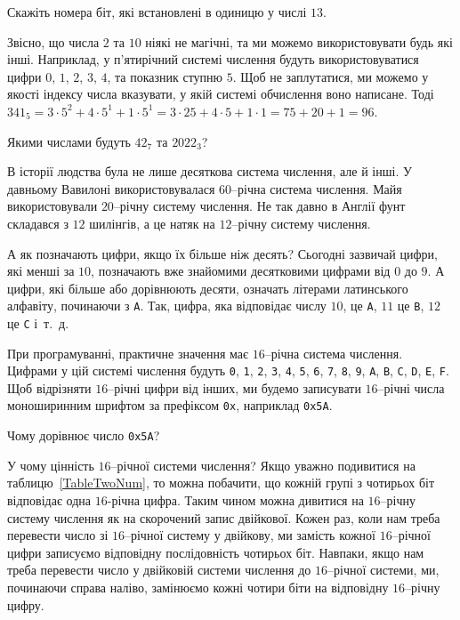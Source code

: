 \documentclass{book}
\newcommand{\bitstr}[1]{{\tt #1}}
\newcommand{\hexstr}[1]{{\tt 0x#1}}
\newcommand{\hexdesc}{ми будемо записувати $16$--річні числа моноширинним шрифтом за префіксом {\tt 0x}, наприклад \hexstr{5A}}
\begin{document}
\begin{exercise}
Скажіть номера біт, які встановлені в одиницю у числі $13$.
\end{exercise}

Звісно, що числа $2$ та $10$ ніякі не магічні, та ми можемо використовувати будь які інші.
Наприклад, у п'ятирічний системі числення будуть використовуватися цифри $0$, $1$, $2$, $3$, $4$, та показник ступню $5$.
Щоб не заплутатися, ми можемо у якості індексу числа вказувати, у якій системі обчислення воно написане.
Тоді $341_5 = 3 \cdot 5^2 + 4 \cdot 5^1 + 1 \cdot 5^1 = 3 \cdot 25 + 4 \cdot 5 + 1 \cdot 1 = 75 + 20 + 1 = 96$.

\begin{exercise}
Якими числами будуть $42_7$ та $2022_3$?
\end{exercise}

В історії людства була не лише десяткова система числення, але й інші.
У давньому Вавилоні використовувалася $60$--річна система числення.
Майя використовували $20$--річну систему числення.
Не так давно в Англії фунт складався з $12$ шилінгів, а це натяк на $12$--річну систему числення.

А як позначають цифри, якщо їх більше ніж десять?
Сьогодні зазвичай цифри, які менші за $10$, позначають вже знайомими десятковими цифрами від $0$ до $9$.
А цифри, які більше або дорівнюють десяти, означать літерами латинського алфавіту, починаючи з \bitstr{A}.
Так, цифра, яка відповідає числу $10$, це \bitstr{A}, $11$ це \bitstr{B}, $12$ це \bitstr{C} і~т.~д.

При програмуванні, практичне значення має $16$--річна система числення.
Цифрами у цій системі числення будуть \bitstr{0}, \bitstr{1}, \bitstr{2}, \bitstr{3}, \bitstr{4}, \bitstr{5}, \bitstr{6}, \bitstr{7}, \bitstr{8}, \bitstr{9}, \bitstr{A}, \bitstr{B}, \bitstr{C}, \bitstr{D}, \bitstr{E}, \bitstr{F}.
Щоб відрізняти $16$--річні цифри від інших, \hexdesc.

\begin{exercise}
Чому дорівнює число \hexstr{5A}?
\end{exercise}

У чому цінність $16$--річної системи числення?
Якщо уважно подивитися на таблицю~\ref{TableTwoNum}, то можна побачити, що кожній групі з чотирьох біт відповідає одна $16$-річна цифра.
Таким чином можна дивитися на $16$--річну систему числення як на скорочений запис двійкової.
Кожен раз, коли нам треба перевести число зі $16$--річної систему у двійкову, ми замість кожної $16$--річної цифри записуємо відповідну послідовність чотирьох біт.
Навпаки, якщо нам треба перевести число у двійковій системи числення до $16$--річної системи, ми, починаючи справа наліво, замінюємо кожні чотири біти на відповідну $16$--річну цифру.
\end{document}
